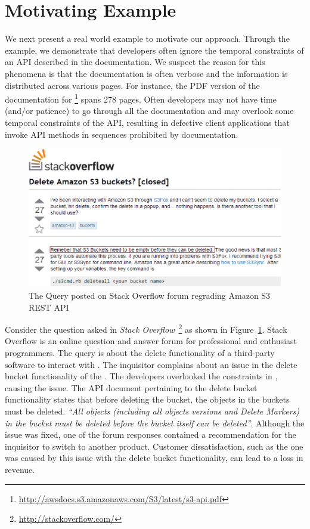 \section{Motivating Example}
\label{sec:example}

We next present a real world example to motivate our approach.
Through the example, we demonstrate that developers often ignore the temporal constraints of an API described in the documentation.
We suspect the reason for this phenomena is that the documentation is often verbose and the information is distributed across various pages.
For instance, the PDF version of the documentation for \amazonAPI\footnote{{\small \url{http://awsdocs.s3.amazonaws.com/S3/latest/s3-api.pdf}}} spans 278 pages.
Often developers may not have time (and/or patience) to go through all the documentation and may overlook some temporal constraints of the API,
resulting in defective client applications that invoke API methods in sequences prohibited by documentation. 

\begin{figure}[t]
	\begin{center}
		\includegraphics[scale=0.45]{Stackoverflow.eps}
	\end{center}
	\caption{\label{fig:Stackoverflow} The Query posted on Stack Overflow forum regrading Amazon S3 REST API}
\end{figure}

Consider the question asked in \textit{Stack Overflow}~\footnote{{\small \url{http://stackoverflow.com/}}} as shown in Figure~\ref{fig:Stackoverflow}.
Stack Overflow is an online question and answer forum for professional and enthusiast programmers.
The query is about the delete functionality of a third-party software  to interact with \amazonAPI.
The inquisitor complains about an issue in the delete bucket functionality of the .
The  developers overlooked the constraints in \amazon, causing the issue.
The API document pertaining to the  delete bucket functionality states that before deleting the bucket, the objects in the buckets must be deleted.
\textit{``All objects (including all objects versions and Delete Markers) in the bucket must be deleted before the bucket itself can be deleted''}.
Although the issue was fixed, one of the forum responses contained a recommendation for the inquisitor to switch to another product.
Customer dissatisfaction, such as the one was caused by this issue with the delete bucket functionality, can lead to a loss in revenue.
 
